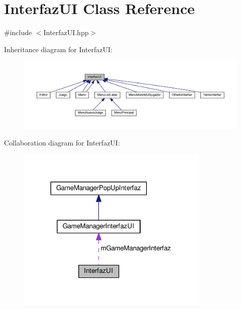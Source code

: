 \hypertarget{class_interfaz_u_i}{}\section{Interfaz\+UI Class Reference}
\label{class_interfaz_u_i}


{\ttfamily \#include $<$Interfaz\+U\+I.\+hpp$>$}



Inheritance diagram for Interfaz\+UI\+:
\nopagebreak
\begin{figure}[H]
\begin{center}
\leavevmode
\includegraphics[width=350pt]{class_interfaz_u_i__inherit__graph}
\end{center}
\end{figure}


Collaboration diagram for Interfaz\+UI\+:\nopagebreak
\begin{figure}[H]
\begin{center}
\leavevmode
\includegraphics[width=261pt]{class_interfaz_u_i__coll__graph}
\end{center}
\end{figure}
